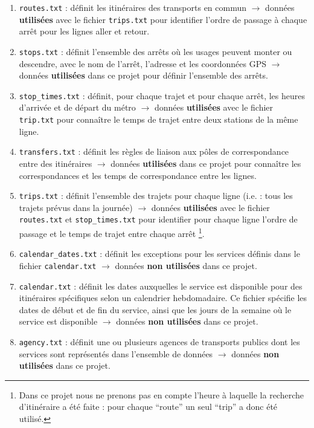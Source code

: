 \documentclass[,french]{article}
\let\rmarkdownfootnote\footnote%
\def\footnote{\protect\rmarkdownfootnote}
\begin{document}
\begin{enumerate}
\def\labelenumi{\arabic{enumi}.}
\item
  \texttt{routes.txt} : définit les itinéraires des transports en commun
  \(\rightarrow\) données \textbf{utilisées} avec le fichier
  \texttt{trips.txt} pour identifier l'ordre de passage à chaque arrêt
  pour les lignes aller et retour.
\item
  \texttt{stops.txt} : définit l'ensemble des arrêts où les usages
  peuvent monter ou descendre, avec le nom de l'arrêt, l'adresse et les
  coordonnées GPS \(\rightarrow\) données \textbf{utilisées} dans ce
  projet pour définir l'ensemble des arrêts.
\item
  \texttt{stop\_times.txt} : définit, pour chaque trajet et pour chaque
  arrêt, les heures d'arrivée et de départ du métro \(\rightarrow\)
  données \textbf{utilisées} avec le fichier \texttt{trip.txt} pour
  connaître le temps de trajet entre deux stations de la même ligne.
\item
  \texttt{transfers.txt} : définit les règles de liaison aux pôles de
  correspondance entre des itinéraires \(\rightarrow\) données
  \textbf{utilisées} dans ce projet pour connaître les correspondances
  et les temps de correspondance entre les lignes.
\item
  \texttt{trips.txt} : définit l'ensemble des trajets pour chaque ligne
  (i.e. : tous les trajets prévus dans la journée) \(\rightarrow\)
  données \textbf{utilisées} avec le fichier \texttt{routes.txt} et
  \texttt{stop\_times.txt} pour identifier pour chaque ligne l'ordre de
  passage et le temps de trajet entre chaque arrêt \footnote{Dans ce
    projet nous ne prenons pas en compte l'heure à laquelle la recherche
    d'itinéraire a été faite : pour chaque ``route'' un seul ``trip'' a
    donc été utilisé.}.
\item
  \texttt{calendar\_dates.txt} : définit les exceptions pour les
  services définis dans le fichier \texttt{calendar.txt} \(\rightarrow\)
  données \textbf{non utilisées} dans ce projet.
\item
  \texttt{calendar.txt} : définit les dates auxquelles le service est
  disponible pour des itinéraires spécifiques selon un calendrier
  hebdomadaire. Ce fichier spécifie les dates de début et de fin du
  service, ainsi que les jours de la semaine où le service est
  disponible \(\rightarrow\) données \textbf{non utilisées} dans ce
  projet.
\item
  \texttt{agency.txt} : définit une ou plusieurs agences de transports
  publics dont les services sont représentés dans l'ensemble de données
  \(\rightarrow\) données \textbf{non utilisées} dans ce projet.
\end{enumerate}
\end{document}
